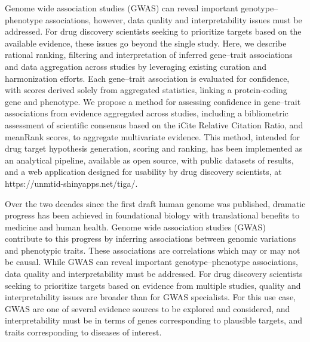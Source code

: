 Genome wide association studies (GWAS) can reveal important genotype–phenotype associations, however, data quality and interpretability issues must be addressed. For drug discovery scientists seeking to prioritize targets based on the available evidence, these issues go beyond the single study. Here, we describe rational ranking, filtering and interpretation of inferred gene–trait associations and data aggregation across studies by leveraging existing curation and harmonization efforts. Each gene–trait association is evaluated for confidence, with scores derived solely from aggregated statistics, linking a protein-coding gene and phenotype. We propose a method for assessing confidence in gene–trait associations from evidence aggregated across studies, including a bibliometric assessment of scientific consensus based on the iCite Relative Citation Ratio, and meanRank scores, to aggregate multivariate evidence. This method, intended for drug target hypothesis generation, scoring and ranking, has been implemented as an analytical pipeline, available as open source, with public datasets of results, and a web application designed for usability by drug discovery scientists, at https://unmtid-shinyapps.net/tiga/\cite{Yang2021-di}.

Over the two decades since the first draft human genome was published, dramatic progress has been achieved in foundational biology with translational benefits to medicine and human health. Genome wide association studies (GWAS) contribute to this progress by inferring associations between genomic variations and phenotypic traits\cite{Bosse2018-yl,Rusu2017-en}. These associations are correlations which may or may not be causal. While GWAS can reveal important genotype–phenotype associations, data quality and interpretability must be addressed\cite{Lambert2012-tr,Visscher2017-jp,Marigorta2018-xk,Gallagher2018-ev}.  For drug discovery scientists seeking to prioritize targets based on evidence from multiple studies, quality and interpretability issues are broader than for GWAS specialists. For this use case, GWAS are one of several evidence sources to be explored and considered, and interpretability must be in terms of genes corresponding to plausible targets, and traits corresponding to diseases of interest.

